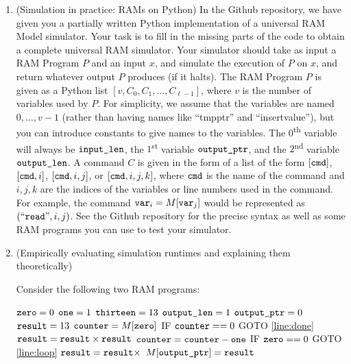 \documentclass[11pt]{article}
\begin{document}
\begin{enumerate}
 
    \item (Simulation in practice: RAMs on Python)  
    In the Github repository, we have given you a partially written Python implementation of a universal RAM Model simulator.  Your task is to fill in the missing parts of the code to obtain a complete universal RAM simulator.
     Your simulator should take as input a RAM Program $P$ and an input $x$, and simulate the execution of $P$ on $x$, and return whatever output $P$ produces (if it halts).  The RAM Program $P$ is given as a Python list $[v,C_0,C_1,\ldots,C_{\ell-1}]$, where $v$ is the number of variables used by $P$.  For simplicity, we assume that the variables are named $0,\ldots,v-1$ (rather than having names like ``tmpptr'' and ``insertvalue''), but you can introduce constants to give names to the variables.  The $0$\textsuperscript{th} variable will always be $\texttt{input\_len}$, the $1$\textsuperscript{st} variable $\texttt{output\_ptr}$, and the $2$\textsuperscript{nd} variable $\texttt{output\_len}$.  A command $C$ is given in the form of a list of the form $[\texttt{cmd}]$, $[\texttt{cmd},i]$, $[\texttt{cmd},i,j]$, or $[\texttt{cmd},i,j,k]$, where $\texttt{cmd}$ is the name of the command and $i,j,k$ are the indices of the variables or line numbers used in the command.  For example,  the command $\texttt{var}_i = M[\texttt{var}_j]$ would be represented as $(``\texttt{read}",i,j)$.  See the Github repository for the precise syntax as well as some RAM programs you can use to test your simulator.

    \item (Empirically evaluating simulation runtimes and explaining them theoretically)  

Consider the following two RAM programs:

\begin{algorithm}[H]
\setcounter{AlgoLine}{-1}
$\texttt{zero} = 0$\;
$\texttt{one} = 1$\;
$\texttt{thirteen} = 13$\;
$\texttt{output\_len} = 1$\;
$\texttt{output\_ptr} = 0$\;
$\texttt{result} = 13$\;
$\texttt{counter} = M[\texttt{zero}]$\;
\Indp
 IF $\texttt{counter} == 0$ GOTO \ref{line:done}\; \label{line:loop}
$\texttt{result} = \texttt{result} \times \texttt{result}$\;
$\texttt{counter} = \texttt{counter} - \texttt{one}$\;
IF $\texttt{zero} == 0$ GOTO \ref{line:loop}\;
\Indm
$\texttt{result} = \texttt{result} \times $\thirteen\; \label{line:done}
$M[\texttt{output\_ptr}]=\texttt{result}$\;
\end{algorithm}


\end{enumerate}
\end{document}
